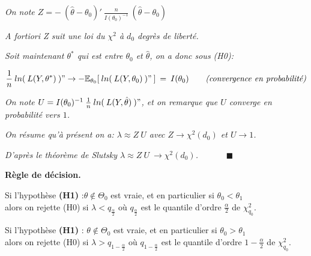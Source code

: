 \documentclass[11pt,fleqn]{book} %
\begin{document}
	\vspace{0.5em}
	
	\textit{On note $Z=-\:(\hat{\theta}-\theta_0)'\:\frac{n}{I(\theta_0)^{-1}}\:(\hat{\theta}-\theta_0)$}
	
	\vspace{1em}
	
	\textit{A fortiori Z suit une loi du $\chi^2$ à $d_0$ degrès de liberté.} 
	
	\vspace{2em}
	
	\textit{Soit maintenant $\theta^{*}$ qui est entre $\theta_0$ et $\hat{\theta}$, on a donc sous (H0):}
	
	\[
	\frac{1}{n}\:ln(\:L(Y,\theta^{*})\:)" \rightarrow -\mathbb{E}_{\theta_0}[\:ln(\:L(Y,\theta_0)\:)"\:]\:=\:I(\theta_0) \qquad \textit{(convergence en probabilité)}
	\]
	
	\vspace{0.5em}
	
	\textit{On note $U=I(\theta_0)^{-1}\:\frac{1}{n}\:ln(\:L(Y,\hat{\theta})\:)"$, et on remarque que $U$ converge en probabilité vers $1$.}
	
	\vspace{1em}
	
	\textit{On résume qu'à présent on a: $\lambda\approx Z\:U$ avec\: $Z\rightarrow\chi^2(d_0)$ \:et\: $U\rightarrow 1$.}
	
	\vspace{1em}
	
	\textit{D'après le théorème de Slutsky  \:$\lambda\approx Z\:U \:\rightarrow \chi^2(d_0)$.} $\quad\quad\quad \blacksquare$ 
	
	\vspace{2em}
	
	\textbf{Règle de décision.}
	
	\vspace{1em}
	
	Si l'hypothèse \textbf{(H1)} :\:$ \theta \notin \Theta_0 $ est vraie, et en particulier si $\theta_0 < \theta_1$\\
	alors on rejette (H0) si \: $\lambda < q_{\frac{\alpha}{2}}$ \:où\: $q_{\frac{\alpha}{2}}$ est le quantile d'ordre $\frac{\alpha}{2}$ de $\chi_{q_0}^2$.
	
	\vspace{1em}
	
	Si l'hypothèse \textbf{(H1)} :\: $ \theta \notin \Theta_0 $ est vraie, et en particulier si $\theta_0 > \theta_1$\\
	alors on rejette (H0) si \: $\lambda > q_{1-\frac{\alpha}{2}}$ \:où\: $q_{1-\frac{\alpha}{2}}$ est le quantile d'ordre $1-\frac{\alpha}{2}$ de $\chi_{q_0}^2$.
	
\end{document}
